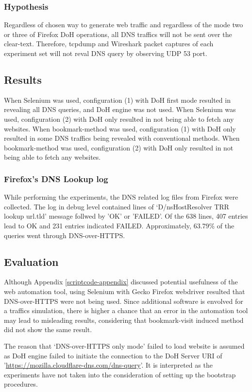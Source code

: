 \subsubsection{Hypothesis}
Regardless of chosen way to generate web traffic and regardless of the mode two or three of Firefox DoH operations, all DNS traffics will not be sent over the clear-text. Therefore, tcpdump and Wireshark packet captures of each experiment set will not reval DNS query by observing UDP 53 port.
\subsection{Results}
When Selenium was used, configuration (1) with DoH first mode resulted in revealing all DNS queries, and DoH engine was not used.
When Selenium was used, configuration (2) with DoH only resulted in not being able to fetch any websites.
When bookmark-method was used, configuration (1) with DoH only resulted in some DNS traffics being revealed with conventional methods.
When bookmark-method was used, configuration (2) with DoH only resulted in not being able to fetch any websites.

\subsubsection{Firefox's DNS Lookup log}
While performing the experiments, the DNS related log files from Firefox were collected.
The log in debug level contained lines of `D/nsHostResolver TRR lookup url.tld' message follwed by 'OK' or 'FAILED'.
Of the 638 lines, 407 entries lead to OK and 231 entries indicated FAILED. Approximately, 63.79\% of the queries went through DNS-over-HTTPS.

\subsection{Evaluation}
Although Appendix \ref{scriptcode-appendix} discussed potential usefulness of the web automation tool, using Selenium with Gecko Firefox webdriver resulted that DNS-over-HTTPS were not being used.
Since additional software is envolved for a traffics simulation, there is higher a chance that an error in the automation tool may lead to misleading results, considering that bookmark-visit induced method did not show the same result.

The reason that `DNS-over-HTTPS only mode' failed to load website is assumed as DoH engine failed to initiate the connection to the DoH Server URI of '\url{https://mozilla.cloudflare-dns.com/dns-query}'. It is interpreted as the experiments have not taken into the consideration of setting up the bootstrap procedures.

